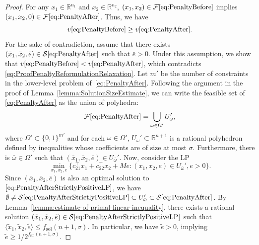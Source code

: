 \documentclass[10pt,a4paper]{amsart}
\newcommand{\EncodingSize}{size}
\newcommand{\FeasSolSet}{\MacroColor{\mathcal{F}}}
\newcommand{\MacroColor}[1]{#1}
\newcommand{\NConstraints}{\MacroColor{m}}
\newcommand{\NVariables}{\MacroColor{n}}
\newcommand{\OptSolSet}{\MacroColor{\mathcal{S}}}
\newcommand{\OptValFunc}{\MacroColor{v}}
\newcommand{\ReformPen}{\MacroColor{e}}
\newcommand{\SizeThree}[3]{\langle#1,#2,#3\rangle}
\newcommand{\SolutionSizeEstimate}{\MacroColor{f_{\mathrm{sol}}}}
\begin{document}
\begin{proof}
For any $x_1 \in \mathbb{R}^{\NVariables_1}$ and $x_2 \in \mathbb{R}^{\NVariables_2}$, $(x_1, x_2) \in \FeasSolSet\eqref{eq:PenaltyBefore}$ implies $(x_1, x_2, 0) \in \FeasSolSet\eqref{eq:PenaltyAfter}$.
Thus, we have 
\begin{equation}
\OptValFunc\eqref{eq:PenaltyBefore} \ge \OptValFunc\eqref{eq:PenaltyAfter}.
\label{eq:ProofPenaltyReformulationRelaxation}
\end{equation}
For the sake of contradiction, assume that there exists $(\bar{x}_1, \bar{x}_2, \bar{\ReformPen}) \in \OptSolSet\eqref{eq:PenaltyAfter}$ such that $\bar{\ReformPen} > 0$.
Under this assumption, we show that $\OptValFunc\eqref{eq:PenaltyBefore} < \OptValFunc\eqref{eq:PenaltyAfter}$, which contradicts \eqref{eq:ProofPenaltyReformulationRelaxation}.
Let $\NConstraints'$ be the number of constraints in the lower-level problem of~\eqref{eq:PenaltyAfter}.
Following the argument in the proof of Lemma~\ref{lemma:SolutionSizeEstimate}, we can write the feasible set of \eqref{eq:PenaltyAfter} as the union of polyhedra:
$$
\FeasSolSet\eqref{eq:PenaltyAfter} = \bigcup_{\omega \in \Omega'} U_{\omega}',
$$
where $\Omega' \subset \{0, 1\}^{\NConstraints'}$ and for each $\omega \in \Omega'$, $U_{\omega}' \subset \mathbb{R}^{\NVariables + 1}$ is a rational polyhedron defined by inequalities whose coefficients are of \EncodingSize{} at most $\sigma$.
Furthermore, there is $\bar{\omega} \in \Omega'$ such that $(\bar{x}_1, \bar{x}_2, \bar{\ReformPen}) \in U_{\bar{\omega}}'$.
Now, consider the LP
\begin{equation}
\min_{x_1, x_2, \ReformPen} \{ c_{2 1}^{\top} x_1 + c_{2 2}^{\top} x_2 + M \ReformPen : (x_1, x_2, \ReformPen) \in U_{\bar{\omega}}', \ReformPen > 0 \}.
\label{eq:PenaltyAfterStrictlyPositiveLP}
\end{equation}
Since $(\bar{x}_1, \bar{x}_2, \bar{\ReformPen})$ is also an optimal solution to $\eqref{eq:PenaltyAfterStrictlyPositiveLP}$, we have $\emptyset \not= \OptSolSet\eqref{eq:PenaltyAfterStrictlyPositiveLP} \subset U_{\bar{\omega}}' \subset \OptSolSet\eqref{eq:PenaltyAfter}$.
By Lemma~\ref{lemma:estimate-of-primal-linear-inequality}, there exists a rational solution $(\tilde{x}_1, \tilde{x}_2, \tilde{\ReformPen}) \in \OptSolSet\eqref{eq:PenaltyAfterStrictlyPositiveLP}$ such that $\SizeThree{\tilde{x}_1}{\tilde{x}_2}{\tilde{\ReformPen}} \le \SolutionSizeEstimate(\NVariables + 1, \sigma)$.
In particular, we have $\tilde{\ReformPen} > 0$, implying $\tilde{\ReformPen} \ge 1 / 2^{\SolutionSizeEstimate(\NVariables + 1, \sigma)}$.

\end{proof}
\end{document}
